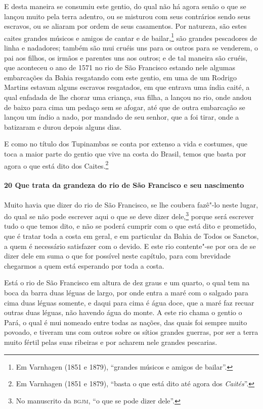 E desta maneira se consumiu este gentio, do qual não há agora senão o que se lançou muito
pela terra adentro, ou se misturou com seus contrários sendo seus escravos, ou se aliaram
por ordem de seus casamentos. Por natureza, são estes caites grandes músicos e amigos de
cantar e de bailar,\footnote{ Em Varnhagen (1851 e 1879), ``grandes músicos e amigos de
bailar''.} são grandes pescadores de linha e nadadores; também são mui cruéis uns para os
outros para se venderem, o pai aos filhos, os irmãos e parentes uns aos outros; e de tal
maneira são cruéis, que aconteceu o ano de 1571 no rio de São Francisco estando nele
algumas embarcações da Bahia resgatando com este gentio, em uma de um Rodrigo Martins
estavam alguns escravos resgatados, em que entrava uma índia caité, a qual enfadada de lhe
chorar uma criança, sua filha, a lançou no rio, onde andou de baixo para cima um pedaço
sem se afogar, até que de outra embarcação se lançou um índio a nado, por mandado de seu
senhor, que a foi tirar, onde a batizaram e durou depois alguns dias.

E como no título dos Tupinambas se conta por extenso a vida e costumes, que toca a maior
parte do gentio que vive na costa do Brasil, temos que basta por agora o que está dito dos
Caites.\footnote{ Em Varnhagen (1851 e 1879), ``basta o que está dito até agora dos
\textit{Caités}''.}

\paragraph{20 Que trata da grandeza do rio de São Francisco e seu nascimento}

Muito havia que dizer do rio de São Francisco, se lhe coubera fazê"-lo neste lugar, do qual
se não pode escrever aqui o que se deve dizer dele,\footnote{ No manuscrito da
\textsc{bgjm}, ``o que se pode dizer dele''.} porque será escrever tudo o que temos dito,
e não se poderá cumprir com o que está dito e prometido, que é tratar toda a costa em
geral, e em particular da Bahia de Todos os Sanctos, a quem é necessário satisfazer com o
devido. E este rio contente"-se por ora de se dizer dele em suma o que for possível neste
capítulo, para com brevidade chegarmos a quem está esperando por toda a costa.

Está o rio de São Francisco em altura de dez graus e um quarto, o qual tem na boca da
barra duas léguas de largo, por onde entra a maré com o salgado para cima duas léguas
somente, e daqui para cima é água doce, que a maré faz recuar outras duas léguas, não
havendo água do monte. A este rio chama o gentio o Pará, o qual é mui nomeado entre todas
as nações, das quais foi sempre muito povoado, e tiveram uns com outros sobre os sítios
grandes guerras, por ser a terra muito fértil pelas suas ribeiras e por acharem nele
grandes pescarias.

